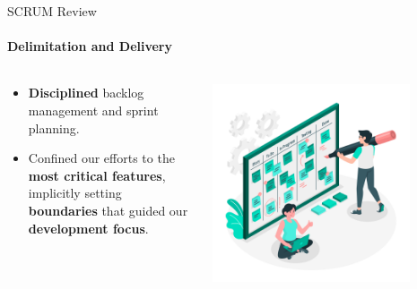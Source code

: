 \documentclass[
ngerman,%
authorontitle=true,
]{bfhbeamer}
\begin{document}
	\begin{frame}{SCRUM Review}
		\framesubtitle{Delimitation and Delivery}
		\begin{columns} %
			\begin{column}{0.6\textwidth} %
				\begin{itemize}
					\item \textbf{Disciplined} backlog management and sprint planning.
					\item Confined our efforts to the \textbf{most critical features}, implicitly setting \textbf{boundaries} that guided our \textbf{development focus}.
				\end{itemize}
			\end{column}
			\begin{column}{0.4\textwidth} %
				\centering
				\includegraphics[width=0.8\textwidth]{pictures/final_presentation/scrum board concept illustration}
			\end{column}
		\end{columns} %
	\end{frame}
	
\end{document}
